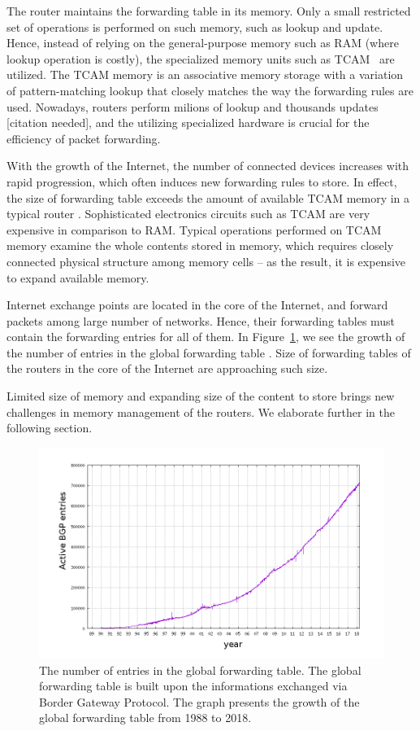 The router maintains the forwarding table in its memory.
Only a small restricted set of operations is performed on such memory, such as lookup and update.
Hence, instead of relying on the general-purpose memory such as RAM (where lookup operation is costly), the specialized memory units such as TCAM~\cite{tcam-memory} are utilized.
The TCAM memory is an associative memory storage with a variation of pattern-matching lookup that closely matches the way the forwarding rules are used.
Nowadays, routers perform milions of lookup and thousands updates [citation needed], and the utilizing specialized hardware is crucial for the efficiency of packet forwarding.

With the growth of the Internet, the number of connected devices increases with rapid progression, which often induces new forwarding rules to store.
In effect, the size of forwarding table exceeds the amount of available TCAM memory in a typical router .
Sophisticated electronics circuits such as TCAM are very expensive in comparison to RAM.
Typical operations performed on TCAM memory examine the whole contents stored in memory, which requires closely connected physical structure among memory cells -- as the result, it is expensive to expand available memory.

Internet exchange points are located in the core of the Internet, and forward packets among large number of networks.
Hence, their forwarding tables must contain the forwarding entries for all of them.
In Figure~\ref{fig:bgp-entries}, we see the growth of the number of entries in the global forwarding table \cite{url-bgp-entries}.
Size of forwarding tables of the routers in the core of the Internet are approaching such size.

Limited size of memory and expanding size of the content to store brings new challenges in memory management of the routers.
We elaborate further in the following section.

\begin{figure}[t]
\centering
\includegraphics[width=0.59\columnwidth]{figs/bgp-entries.png}
\caption{The number of entries in the global forwarding table. The global forwarding table is built upon the informations exchanged via Border Gateway Protocol. The graph presents the growth of the global forwarding table from 1988 to 2018.}\label{fig:bgp-entries}
\vspace{-1em}
\end{figure}



